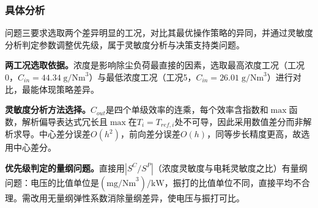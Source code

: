 
\subsubsection{具体分析}

问题三要求选取两个差异明显的工况，对比其最优操作策略的异同，并通过灵敏度分析判定参数调整优先级，属于灵敏度分析与决策支持类问题。

\textbf{两工况选取依据。}浓度是影响除尘负荷最直接的因素，选取最高浓度工况（工况0，$C_{in}=44.34\;\text{g/Nm}^3$）与最低浓度工况（工况5，$C_{in}=26.01\;\text{g/Nm}^3$）进行对比，最能体现策略差异。

\textbf{灵敏度分析方法选择。}$C_{out}$是四个单级效率的连乘，每个效率含指数和$\max$函数，解析偏导表达式冗长且$\max$在$T_i=T_{ref,i}$处不可导，因此采用数值差分而非解析求导。中心差分误差$O(h^2)$，前向差分误差$O(h)$，同等步长精度更高，故选用中心差分。

\textbf{优先级判定的量纲问题。}直接用$|S^C/S^P|$（浓度灵敏度与电耗灵敏度之比）有量纲问题：电压的比值单位是$(\text{mg/Nm}^3)/\text{kW}$，振打的比值单位不同，直接平均不合理。需改用无量纲弹性系数消除量纲差异，使电压与振打可比。
